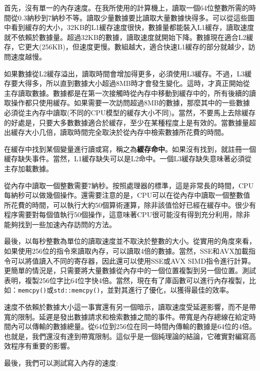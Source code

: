 首先，沒有單一的內存速度。在我所使用的計算機上，讀取一個64位整數所需的時間從0.3納秒到7納秒不等。讀取少量數據要比讀取大量數據快得多。可以從這些圖中看到緩存的大小，32KB的L1緩存速度很快，數據量都能裝入L1緩存，讀取速度就不依賴於數據量。超過32KB的數據，讀取速度就開始下降。數據現在適合L2緩存，它更大(256KB)，但速度更慢。數組越大，適合快速L1緩存的部分就越少，訪問速度越慢。

如果數據從L2緩存溢出，讀取時間會增加得更多，必須使用L3緩存。不過，L3緩存要大得多，所以直到數據大小超過8MB時才會發生變化。這時，才真正開始從主存讀取數據。數據都是在第一次接觸時從內存中移動到緩存中的，所有後續的讀取操作都只使用緩存。如果需要一次訪問超過8MB的數據，那麼其中的一些數據必須從主內存中讀取(不同的CPU模型的緩存大小不同)。當然，不要馬上去除緩存的好處是，只要大多數數據適合於緩存，至少在某種程度上是有效的。當數據量超出緩存大小几倍，讀取時間完全取決於從內存中檢索數據所花費的時間。

在緩存中找到某個變量進行讀或寫，稱之為\textbf{緩存命中}。如果沒有找到，就註冊一個緩存缺失事件。當然，L1緩存缺失可以是L2命中。一個L3緩存缺失意味著必須從主存加載數據。

從內存中讀取一個整數需要7納秒。按照處理器的標準，這是非常長的時間，CPU每納秒可以做幾個操作。還需要注意的是，CPU可以在從內存中讀取一個整數值所花費的時間，可以執行大約50個算術運算，除非該值恰好已經在緩存中。很少有程序需要對每個值執行50個操作，這意味著CPU很可能沒有得到充分利用，除非能夠找到一些加速內存訪問的方法。

最後，以每秒整數為單位的讀取速度並不取決於整數的大小。從實用的角度來看，如果使用256位的指令來讀取內存，可以讀取4倍的數據。當然，SSE和AVX加載指令可以將值讀入不同的寄存器，因此還可以使用SSE或AVX SIMD指令進行計算。更簡單的情況是，只需要將大量數據從內存中的一個位置複製到另一個位置。測試表明，複製256位字比64位字快4倍。當然，現在有了庫函數可以進行內存複製，比如：\texttt{memcpy()}或\texttt{std::memcpy()}，並對其進行了優化，以獲得最佳的效率。

速度不依賴於數據大小這一事實還有另一個暗示，讀取速度受延遲影響，而不是帶寬的限制。延遲是發出數據請求和檢索數據之間的事件。帶寬是內存總線在給定時間內可以傳輸的數據總量。從64位到256位在同一時間內傳輸的數據是64位的4倍。也就是，我們還沒有達到帶寬限制。這似乎是一個純理論的結論，它確實對編寫高效程序有重要的影響。

最後，我們可以測試寫入內存的速度:

